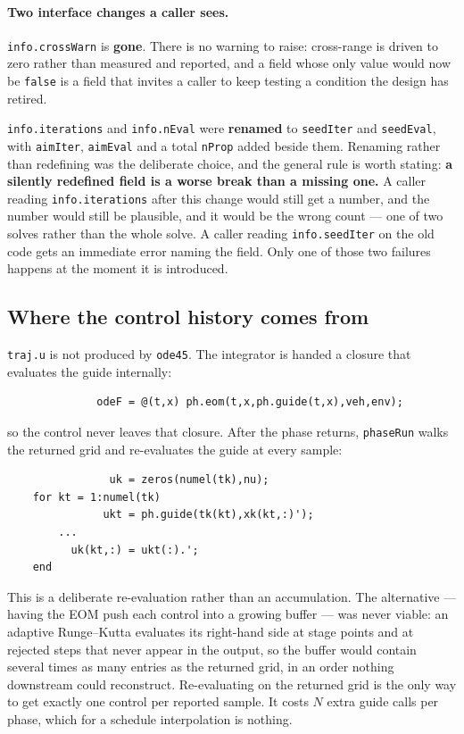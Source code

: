 \documentclass[11pt]{article}
\newcommand{\code}[1]{\texttt{#1}}
\begin{document}
\paragraph{Two interface changes a caller sees.} \code{info.crossWarn} is
\textbf{gone}. There is no warning to raise: cross-range is driven to zero
rather than measured and reported, and a field whose only value would now be
\code{false} is a field that invites a caller to keep testing a condition the
design has retired.

\code{info.iterations} and \code{info.nEval} were \textbf{renamed} to
\code{seedIter} and \code{seedEval}, with \code{aimIter}, \code{aimEval} and a
total \code{nProp} added beside them. Renaming rather than redefining was the
deliberate choice, and the general rule is worth stating: \textbf{a silently
redefined field is a worse break than a missing one.} A caller reading
\code{info.iterations} after this change would still get a number, and the
number would still be plausible, and it would be the wrong count --- one of two
solves rather than the whole solve. A caller reading \code{info.seedIter} on
the old code gets an immediate error naming the field. Only one of those two
failures happens at the moment it is introduced.

\subsection{Where the control history comes from}

\code{traj.u} is not produced by \code{ode45}. The integrator is handed a
closure that evaluates the guide internally:

\begin{lstlisting}
              odeF = @(t,x) ph.eom(t,x,ph.guide(t,x),veh,env);
\end{lstlisting}

so the control never leaves that closure. After the phase returns,
\code{phaseRun} walks the returned grid and re-evaluates the guide at every
sample:

\begin{lstlisting}
                uk = zeros(numel(tk),nu);
    for kt = 1:numel(tk)
               ukt = ph.guide(tk(kt),xk(kt,:)');
        ...
          uk(kt,:) = ukt(:).';
    end
\end{lstlisting}

This is a deliberate re-evaluation rather than an accumulation. The
alternative --- having the EOM push each control into a growing buffer --- was
never viable: an adaptive Runge--Kutta evaluates its right-hand side at stage
points and at rejected steps that never appear in the output, so the buffer
would contain several times as many entries as the returned grid, in an order
nothing downstream could reconstruct. Re-evaluating on the returned grid is the
only way to get exactly one control per reported sample. It costs $N$ extra
guide calls per phase, which for a schedule interpolation is nothing.
\end{document}
